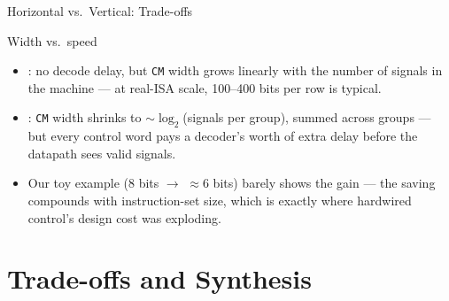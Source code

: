 \documentclass[aspectratio=169]{beamer}
\begin{document}
\begin{frame}{Horizontal vs.\ Vertical: Trade-offs}
  \begin{block}{Width vs.\ speed}
    \begin{itemize}
      \item {}: no decode delay, but \texttt{CM} width grows
        linearly with the number of signals in the machine --- at real-ISA
        scale, 100--400 bits per row is typical.
      \item {}: \texttt{CM} width shrinks to
        $\sim\!\log_2$(signals per group), summed across groups --- but every
        control word pays a decoder's worth of extra delay before the
        datapath sees valid signals.
      \item Our toy example (8 bits $\to$ $\approx$6 bits) barely shows the
        gain --- the saving compounds with instruction-set size, which is
        exactly where hardwired control's design cost was exploding.
    \end{itemize}
  \end{block}
\end{frame}


\section{Trade-offs and Synthesis}
\end{document}

